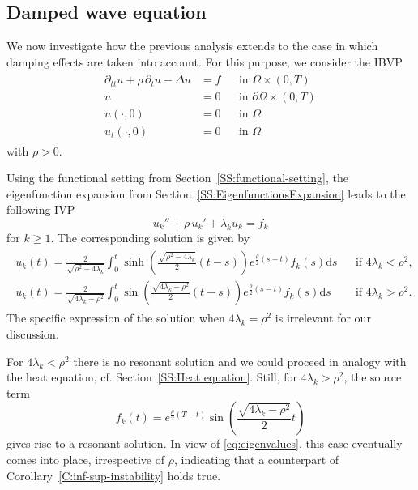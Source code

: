\documentclass{amsart}
\theoremstyle{plain}
\theoremstyle{remark}
\numberwithin{equation}{section}
\numberwithin{theorem}{section}
\begin{document}
\subsection{Damped wave equation}
\label{SS:damping}
We now investigate how the previous analysis extends to the case in which damping effects are taken into account.
For this purpose, we consider the IBVP 
\begin{equation*}
	\begin{aligned}
		\begin{aligned}
			\partial_{tt} u +\rho\,\partial_t u - \Delta u & = f && \text{in } \Omega\times (0,T) \\
			u & = 0 && \text{in } \partial\Omega \times (0,T) \\
			u(\cdot, 0) & = 0 && \text{in } \Omega \\
			u_t(\cdot, 0) & = 0 && \text{in } \Omega
		\end{aligned}
	\end{aligned}
\end{equation*}
with $\rho>0$. 

Using the functional setting from Section~\ref{SS:functional-setting}, the eigenfunction expansion from Section~\ref{SS:EigenfunctionsExpansion} leads to the following IVP 
\begin{equation*}
	u_k'' + \rho\,u_k' +\lambda_k u_k = f_k
\end{equation*}
for $k \geq 1$. The corresponding solution is given by
\begin{align*}
	\begin{aligned}
		\displaystyle u_k(t) = \frac{2}{\sqrt{\rho^2-4\lambda_k}}\int_0^t \sinh\left(\frac{\sqrt{\rho^2-4\lambda_k}}{2}(t-s)\right) e^{\frac{\rho}{2}(s-t)}f_k(s)\mathrm{d}s && \text{if } 4\lambda_k< \rho^2, \\
		\displaystyle u_k(t) = \frac{2}{\sqrt{4\lambda_k-\rho^2}}\int_0^t \sin\left(\frac{\sqrt{4\lambda_k-\rho^2}}{2}(t-s)\right) e^{\frac{\rho}{2}(s-t)}f_k(s)\mathrm{d}s &&  \text{if } 4\lambda_k> \rho^2. 
	\end{aligned}
\end{align*}
The specific expression of the solution when $4\lambda_k = \rho^2$ is irrelevant for our discussion.

For $4\lambda_k < \rho^2$ there is no resonant solution and we could proceed in analogy with the heat equation, cf. Section~\ref{SS:Heat equation}. Still, for $4\lambda_k > \rho^2$, the source term
\[
f_k(t) = e^{\frac{\rho}{2}(T-t)}\sin\left(\frac{\sqrt{4\lambda_k-\rho^2}}{2}t\right)
\]
gives rise to a resonant solution. In view of \eqref{eq:eigenvalues}, this case eventually comes into place, irrespective of $\rho$, indicating that a counterpart of Corollary~\ref{C:inf-sup-instability} holds true.  
\end{document}
